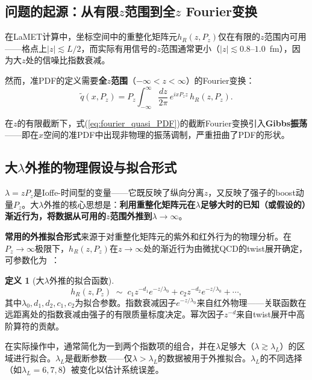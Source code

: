 \documentclass[12pt,a4paper]{ctexart}
\theoremstyle{definition}
\newtheorem{definition}{定义}[section]
\begin{document}
\subsection{问题的起源：从有限$z$范围到全$z$ Fourier变换}

在LaMET计算中，坐标空间中的重整化矩阵元$h_R(z, P_z)$仅在有限的$z$范围内可用——格点上$|z| \lesssim L/2$，而实际有用信号的$z$范围通常更小（$|z| \lesssim 0.8\text{--}1.0$~fm），因为大$z$处的信噪比指数衰减。

然而，准PDF的定义需要\textbf{全$z$范围}（$-\infty < z < \infty$）的Fourier变换：
\begin{equation}
\tilde{q}(x, P_z) = P_z \int_{-\infty}^{\infty} \frac{dz}{2\pi}\, e^{i x P_z z}\, h_R(z, P_z).
\label{eq:fourier_quasi_PDF}
\end{equation}

在$z$的有限截断下，式(\ref{eq:fourier_quasi_PDF})的截断Fourier变换引入\textbf{Gibbs振荡}——即在$x$空间的准PDF中出现非物理的振荡调制，严重扭曲了PDF的形状。

\subsection{大$\lambda$外推的物理假设与拟合形式}

$\lambda = zP_z$是Ioffe-时间型的变量——它既反映了纵向分离$z$，又反映了强子的boost动量$P_z$。大$\lambda$外推的核心思想是：\textbf{利用重整化矩阵元在$\lambda$足够大时的已知（或假设的）渐近行为，将数据从可用的$z$范围外推到$\lambda \to \infty$}。

\textbf{常用的外推拟合形式}来源于对重整化矩阵元的紫外和红外行为的物理分析。在$P_z \to \infty$极限下，$h_R(z, P_z)$在$z \to \infty$处的渐近行为由微扰QCD的twist展开确定，可参数化为~\cite{Ji2021hybrid,Chen2025gluon}：

\begin{definition}[大$\lambda$外推的拟合函数]
\begin{equation}
\boxed{h_R(z, P_z) \;\sim\; c_1 z^{-d_1} e^{-z/\lambda_0} + c_2 z^{-d_2} e^{-z/\lambda_0} + \cdots},
\label{eq:lambda_fit_form}
\end{equation}
其中$\lambda_0, d_1, d_2, c_1, c_2$为拟合参数。指数衰减因子$e^{-z/\lambda_0}$来自红外物理——关联函数在远距离处的指数衰减由强子的有限质量标度决定。幂次因子$z^{-d}$来自twist展开中高阶算符的贡献。
\end{definition}

在实际操作中，通常简化为一到两个指数项的组合，并在$\lambda$足够大（$\lambda \gtrsim \lambda_L$）的区域进行拟合。$\lambda_L$是截断参数——仅$\lambda > \lambda_L$的数据被用于外推拟合。$\lambda_L$的不同选择（如$\lambda_L = 6, 7, 8$）被变化以估计系统误差。
\end{document}

